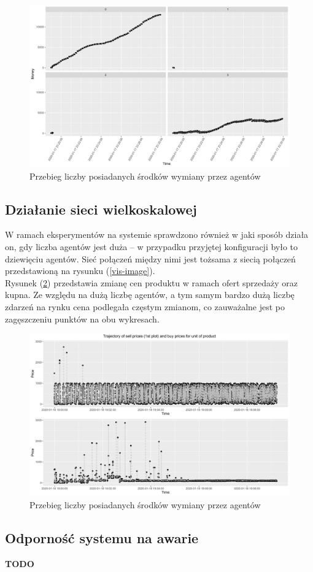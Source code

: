 \documentclass{article}
\begin{document}
\begin{figure}[H]
	\centering
	\includegraphics[width=\textwidth]{./monopoly-money.png}
	\caption{Przebieg liczby posiadanych środków wymiany przez agentów}
	\label{monopoly-money}
\end{figure}

\subsection{Działanie sieci wielkoskalowej}

W ramach eksperymentów na systemie sprawdzono również w jaki sposób działa on, gdy liczba agentów jest duża -- w przypadku przyjętej konfiguracji było to dziewięciu agentów.
Sieć połączeń między nimi jest tożsama z siecią połączeń przedstawioną na rysunku (\ref{vis-image}).\\
Rysunek (\ref{big-net-money}) przedstawia zmianę cen produktu w ramach ofert sprzedaży oraz kupna. Ze względu na dużą liczbę agentów, a tym samym bardzo dużą liczbę zdarzeń na rynku cena podlegała częstym zmianom, co zauważalne 
jest po zagęszczeniu punktów na obu wykresach.

\begin{figure}[H]
	\centering
	\includegraphics[width=\textwidth]{./big-net-money.png}
	\caption{Przebieg liczby posiadanych środków wymiany przez agentów}
	\label{big-net-money}
\end{figure}

\subsection{Odporność systemu na awarie}

\large \textbf{ TODO }
\end{document}
